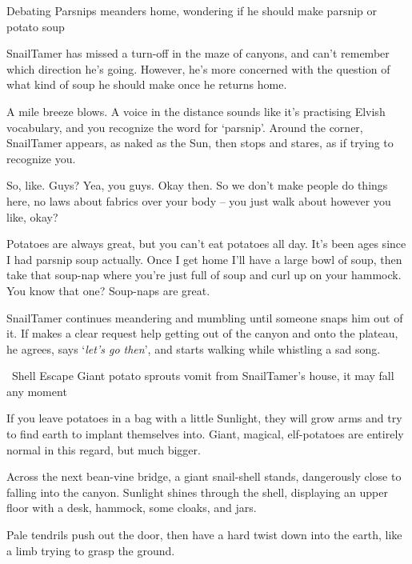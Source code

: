 
{Debating Parsnips}%
{ meanders home, wondering if he should make parsnip or potato soup}%

\Gls{SnailTamer} has missed a turn-off in the maze of canyons, and can't remember which direction he's going.
However, he's more concerned with the question of what kind of soup he should make once he returns home.

\begin{boxtext}
  A mile breeze blows.
  A voice in the distance sounds like it's practising Elvish vocabulary, and you recognize the word for `parsnip'.
  Around the corner, \gls{SnailTamer} appears, as naked as the Sun, then stops and stares, as if trying to recognize you.
\end{boxtext}

\begin{speechtext}
  So, like.  Guys?  Yea, you guys.  Okay then.  So we don't make people do things here, no laws about fabrics over your body -- you just walk about however you like, okay?

  Potatoes are always great, but you can't eat potatoes all day.
  It's been ages since I had parsnip soup actually.
  Once I get home I'll have a large bowl of soup, then take that soup-nap where you're just full of soup and curl up on your hammock.
  You know that one?
  Soup-naps are great.
\end{speechtext}

\Gls{SnailTamer} continues meandering and mumbling until someone snaps him out of it.
If  makes a clear request help getting out of the canyon and onto the plateau, he agrees, says `\textit{let's go then}', and starts walking while whistling a sad song.

{~Shell Escape}%
{Giant potato sprouts vomit from \gls{SnailTamer}'s house, it may fall any moment}%

If you leave potatoes in a bag with a little Sunlight, they will grow arms and try to find earth to implant themselves into.
Giant, magical, elf-potatoes are entirely normal in this regard, but much bigger.

\begin{boxtext}
  Across the next bean-vine bridge, a giant snail-shell stands, dangerously close to falling into the canyon.
  Sunlight shines through the shell, displaying an upper floor with a desk, hammock, some cloaks, and jars.

  Pale tendrils push out the door, then have a hard twist down into the earth, like a limb trying to grasp the ground.
\end{boxtext}

